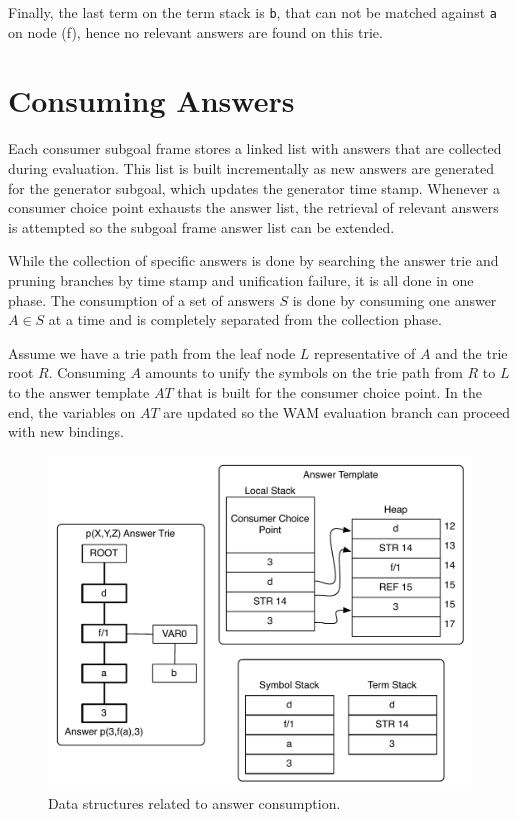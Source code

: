 Finally, the last term on the term stack is \texttt{b}, that
can not be matched against \texttt{a} on node (f), hence no
relevant answers are found on this trie.

\section{Consuming Answers}

Each consumer subgoal frame stores a linked list with answers that are collected
during evaluation. This list is built incrementally as new answers are generated
for the generator subgoal, which updates the generator time stamp.
Whenever a consumer choice point exhausts the answer list, the retrieval
of relevant answers is attempted so the subgoal frame answer list can be extended.

While the collection of specific answers is done by searching the answer trie
and pruning branches by time stamp and unification failure, it is all done in one
phase. The consumption of a set of answers $S$ is done by consuming one answer $A \in S$
at a time and is completely separated from the collection phase.

Assume we have a trie path from the leaf node $L$ representative of $A$ and
the trie root $R$. Consuming $A$ amounts to unify the symbols on the trie path from $R$ to $L$
to the answer template $AT$ that is built for the consumer choice point. In the end, the variables
on $AT$ are updated so the WAM evaluation branch can proceed with new bindings.

\begin{figure}[H]
  \centering
    \includegraphics[scale=0.6]{consume_answer.pdf}
  \caption{Data structures related to answer consumption.}
  \label{fig:consume_answer}
\end{figure}

